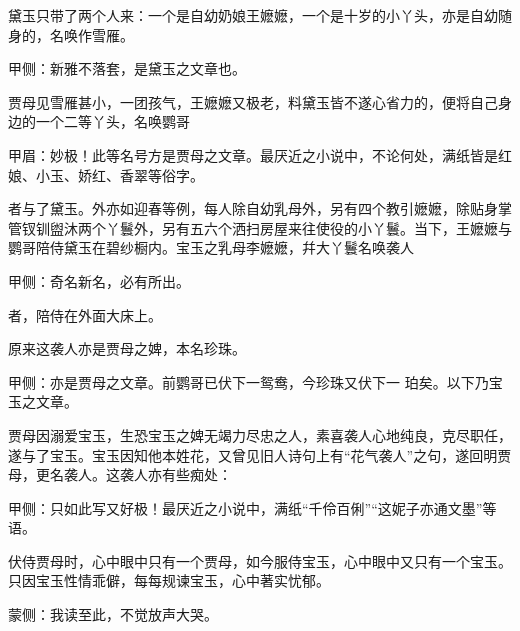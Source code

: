 \begin{parag}
    黛玉只带了两个人来：一个是自幼奶娘王嬷嬷，一个是十岁的小丫头，亦是自幼随身的，名唤作雪雁。\begin{note}甲侧：新雅不落套，是黛玉之文章也。\end{note}贾母见雪雁甚小，一团孩气，王嬷嬷又极老，料黛玉皆不遂心省力的，便将自己身边的一个二等丫头，名唤鹦哥\begin{note}甲眉：妙极！此等名号方是贾母之文章。最厌近之小说中，不论何处，满纸皆是红娘、小玉、娇红、香翠等俗字。\end{note}者与了黛玉。外亦如迎春等例，每人除自幼乳母外，另有四个教引嬷嬷，除贴身掌管钗钏盥沐两个丫鬟外，另有五六个洒扫房屋来往使役的小丫鬟。当下，王嬷嬷与鹦哥陪侍黛玉在碧纱橱内。宝玉之乳母李嬷嬷，幷大丫鬟名唤袭人\begin{note}甲侧：奇名新名，必有所出。\end{note}者，陪侍在外面大床上。
\end{parag}


\begin{parag}
    原来这袭人亦是贾母之婢，本名珍珠。\begin{note}甲侧：亦是贾母之文章。前鹦哥已伏下一鸳鸯，今珍珠又伏下一  珀矣。以下乃宝玉之文章。\end{note}贾母因溺爱宝玉，生恐宝玉之婢无竭力尽忠之人，素喜袭人心地纯良，克尽职任，遂与了宝玉。宝玉因知他本姓花，又曾见旧人诗句上有“花气袭人”之句，遂回明贾母，更名袭人。这袭人亦有些痴处：\begin{note}甲侧：只如此写又好极！最厌近之小说中，满纸“千伶百俐”“这妮子亦通文墨”等语。\end{note}伏侍贾母时，心中眼中只有一个贾母，如今服侍宝玉，心中眼中又只有一个宝玉。只因宝玉性情乖僻，每每规谏宝玉，心中著实忧郁。\begin{note}蒙侧：我读至此，不觉放声大哭。\end{note}
\end{parag}


